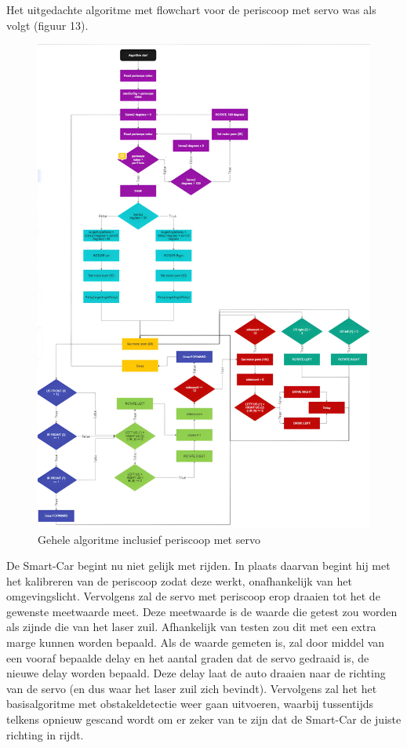 Het uitgedachte algoritme met flowchart voor de periscoop met servo was als volgt (figuur 13). 
\begin{figure}[h]
    \centering
    \includegraphics[scale = 0.3]{Media/Figuren/Periscoop algoritme met servo.jpg}
    \caption{Gehele algoritme inclusief periscoop met servo}
    \label{Volledig algoritme met periscoop en servo}
\end{figure}

De \gls{Smart-Car} begint nu niet gelijk met rijden. In plaats daarvan begint hij met het kalibreren van de periscoop zodat deze werkt, onafhankelijk van het omgevingslicht. Vervolgens zal de servo met periscoop erop draaien tot het de gewenste meetwaarde meet. Deze meetwaarde is de waarde die getest zou worden als zijnde die van het laser zuil. Afhankelijk van testen zou dit met een extra marge kunnen worden bepaald. Als de waarde gemeten is, zal door middel van een vooraf bepaalde delay en het aantal graden dat de servo gedraaid is, de nieuwe delay worden bepaald. Deze delay laat de auto draaien naar de richting van de servo (en dus waar het laser zuil zich bevindt). Vervolgens zal het het basisalgoritme met obstakeldetectie weer gaan uitvoeren, waarbij tussentijds telkens opnieuw gescand wordt om er zeker van te zijn dat de \gls{Smart-Car} de juiste richting in rijdt. 
\clearpage
\newpage
